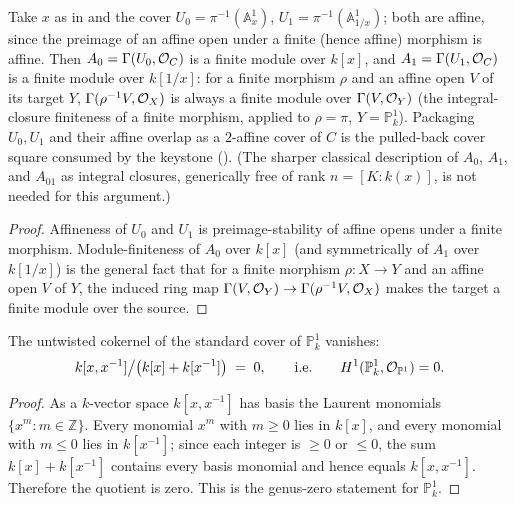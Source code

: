 \begin{proposition}
  \label{thm:adelic_chart_finite_over_P1}
  \leanok
  Take \(x\) as in  and the
  cover \(U_0 = \pi^{-1}(\mathbb{A}^1_x)\),
  \(U_1 = \pi^{-1}(\mathbb{A}^1_{1/x})\); both are affine, since the
  preimage of an affine open under a finite (hence affine) morphism is
  affine. Then \(A_0 = \Gamma(U_0, \mathcal{O}_{C})\) is a finite module over
  \(k[x]\), and \(A_1 = \Gamma(U_1, \mathcal{O}_{C})\) is a finite module over
  \(k[1/x]\): for a finite morphism \(\rho\) and an affine open \(V\) of
  its target \(Y\), \(\Gamma(\rho^{-1}V, \mathcal{O}_{X})\) is always a finite
  module over \(\Gamma(V, \mathcal{O}_{Y})\) (the integral-closure finiteness
  of a finite morphism, applied to \(\rho = \pi\), \(Y = \mathbb{P}^1_k\)).
  Packaging \(U_0, U_1\) and their affine overlap as a
  \(2\)-affine cover of \(C\) is the pulled-back cover square consumed by
  the keystone (). (The
  sharper classical description of \(A_0\), \(A_1\), and \(A_{01}\) as
  integral closures, generically free of rank \(n=[K:k(x)]\), is not
  needed for this argument.)
\end{proposition}
\begin{proof}
  \leanok
  Affineness of \(U_0\) and \(U_1\) is preimage-stability of affine opens
  under a finite morphism. Module-finiteness of \(A_0\) over \(k[x]\)
  (and symmetrically of \(A_1\) over \(k[1/x]\)) is the general fact that
  for a finite morphism \(\rho \colon X \to Y\) and an affine open \(V\)
  of \(Y\), the induced ring map \(\Gamma(V, \mathcal{O}_{Y}) \to
  \Gamma(\rho^{-1}V, \mathcal{O}_{X})\) makes the target a finite module over
  the source.
\end{proof}
\begin{lemma}
  \label{thm:adelic_cokernel_P1_zero}
  \leanok
  The untwisted cokernel of the standard cover of \(\mathbb{P}^1_k\)
  vanishes:
  \[
    k[x, x^{-1}] \big/ \bigl(k[x] + k[x^{-1}]\bigr) \;=\; 0,
    \qquad\text{i.e.}\qquad H^1(\mathbb{P}^1_k, \mathcal{O}_{\mathbb{P}^1}) = 0.
  \]
\end{lemma}
\begin{proof}
  \leanok
  As a \(k\)-vector space \(k[x, x^{-1}]\) has basis the Laurent
  monomials \(\{x^m : m \in \mathbb{Z}\}\). Every monomial \(x^m\) with
  \(m \ge 0\) lies in \(k[x]\), and every monomial with \(m \le 0\) lies
  in \(k[x^{-1}]\); since each integer is \(\ge 0\) or \(\le 0\), the sum
  \(k[x] + k[x^{-1}]\) contains every basis monomial and hence equals
  \(k[x, x^{-1}]\). Therefore the quotient is zero. This is the genus-zero
  statement for \(\mathbb{P}^1_k\).
\end{proof}

